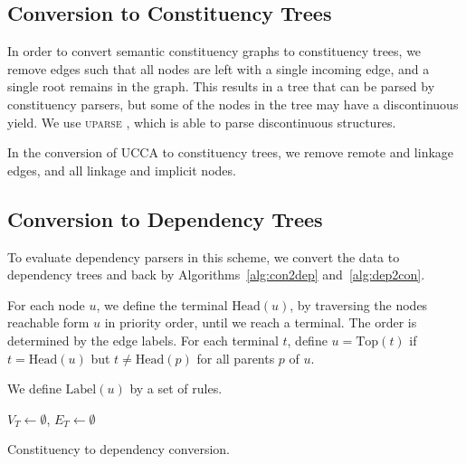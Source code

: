 \documentclass[11pt]{article}
\begin{document}
\subsection{Conversion to Constituency Trees}

In order to convert semantic constituency graphs to constituency trees, we remove edges such that all nodes are left with a single incoming edge, and a single root remains in the graph. This results in a tree that can be parsed by constituency parsers, but some of the nodes in the tree may have a discontinuous yield. We use \textsc{uparse} \cite{maier2015discontinuous}, which is able to parse discontinuous structures.

In the conversion of UCCA to constituency trees, we remove remote and linkage edges, and all linkage and implicit nodes.


\subsection{Conversion to Dependency Trees}
\label{subsec:con2dep}

To evaluate dependency parsers in this scheme, we convert the data to dependency trees and back by Algorithms~\ref{alg:con2dep} and~\ref{alg:dep2con}.

For each node $u$, we define the terminal $\mathrm{Head}(u)$, by traversing the nodes reachable form $u$ in priority order, until we reach a terminal. The order is determined by the edge labels. For each terminal $t$, define $u=\mathrm{Top}(t)$ if $t=\mathrm{Head}(u)$ but $t\neq \mathrm{Head}(p)$ for all parents $p$ of $u$.

We define $\mathrm{Label}(u)$ by a set of rules.

\begin{algorithm}[t]
 $V_T \leftarrow \emptyset$,
 $E_T \leftarrow \emptyset$\\
 \caption{Constituency to dependency conversion.}
 \label{alg:con2dep}
\end{algorithm}
\end{document}
